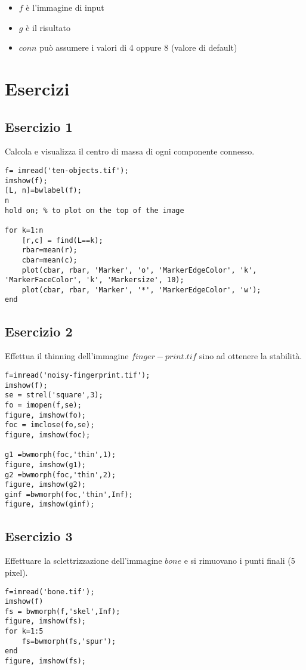 \begin{itemize}
	\item $f$ è l'immagine di input
	\item $g$ è il risultato
	\item $conn$ può assumere i valori di 4 oppure 8 (valore di default)
\end{itemize}

\section{Esercizi}

\subsection{Esercizio 1}
Calcola e visualizza il centro di massa di ogni componente connesso.
\begin{lstlisting}
f= imread('ten-objects.tif');
imshow(f);
[L, n]=bwlabel(f);
n
hold on; % to plot on the top of the image

for k=1:n
	[r,c] = find(L==k);
	rbar=mean(r);
	cbar=mean(c);
	plot(cbar, rbar, 'Marker', 'o', 'MarkerEdgeColor', 'k', 'MarkerFaceColor', 'k', 'Markersize', 10);
	plot(cbar, rbar, 'Marker', '*', 'MarkerEdgeColor', 'w');
end
\end{lstlisting}

\subsection{Esercizio 2}
Effettua il thinning dell'immagine $finger-print.tif$ sino ad ottenere la stabilità.
\begin{lstlisting}
f=imread('noisy-fingerprint.tif');
imshow(f);
se = strel('square',3);
fo = imopen(f,se);
figure, imshow(fo);
foc = imclose(fo,se);
figure, imshow(foc);

g1 =bwmorph(foc,'thin',1);
figure, imshow(g1);
g2 =bwmorph(foc,'thin',2);
figure, imshow(g2);
ginf =bwmorph(foc,'thin',Inf);
figure, imshow(ginf);
\end{lstlisting}

\subsection{Esercizio 3}
Effettuare la sclettrizzazione dell'immagine $bone$ e si rimuovano i punti finali (5 pixel).
\begin{lstlisting}
f=imread('bone.tif');
imshow(f)
fs = bwmorph(f,'skel',Inf);
figure, imshow(fs);
for k=1:5
	fs=bwmorph(fs,'spur');
end
figure, imshow(fs);
\end{lstlisting}

